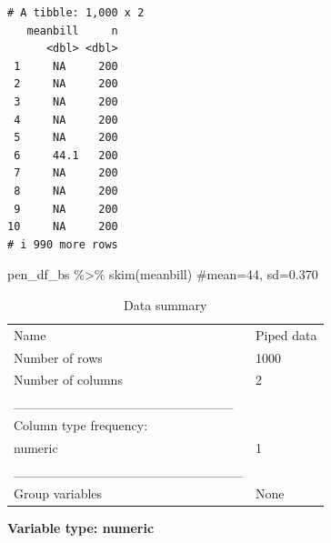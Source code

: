 \documentclass[
  letterpaper,
  DIV=11,
  numbers=noendperiod]{scrartcl}
\newenvironment{Shaded}{\begin{snugshade}}{\end{snugshade}}
\newcommand{\CommentTok}[1]{\textcolor[rgb]{0.37,0.37,0.37}{#1}}
\newcommand{\FunctionTok}[1]{\textcolor[rgb]{0.28,0.35,0.67}{#1}}
\newcommand{\NormalTok}[1]{\textcolor[rgb]{0.00,0.23,0.31}{#1}}
\newcommand{\SpecialCharTok}[1]{\textcolor[rgb]{0.37,0.37,0.37}{#1}}
\begin{document}
\begin{verbatim}
# A tibble: 1,000 x 2
   meanbill     n
      <dbl> <dbl>
 1     NA     200
 2     NA     200
 3     NA     200
 4     NA     200
 5     NA     200
 6     44.1   200
 7     NA     200
 8     NA     200
 9     NA     200
10     NA     200
# i 990 more rows
\end{verbatim}

\begin{Shaded}
\begin{Highlighting}[]
\NormalTok{pen\_df\_bs }\SpecialCharTok{\%\textgreater{}\%}
  \FunctionTok{skim}\NormalTok{(meanbill) }\CommentTok{\#mean=44, sd=0.370}
\end{Highlighting}
\end{Shaded}

\begin{longtable}[]{@{}ll@{}}
\caption{Data summary}\tabularnewline
\toprule\noalign{}
\endfirsthead
\endhead
\bottomrule\noalign{}
\endlastfoot
Name & Piped data \\
Number of rows & 1000 \\
Number of columns & 2 \\
\_\_\_\_\_\_\_\_\_\_\_\_\_\_\_\_\_\_\_\_\_\_\_ & \\
Column type frequency: & \\
numeric & 1 \\
\_\_\_\_\_\_\_\_\_\_\_\_\_\_\_\_\_\_\_\_\_\_\_\_ & \\
Group variables & None \\
\end{longtable}

\textbf{Variable type: numeric}
\end{document}
